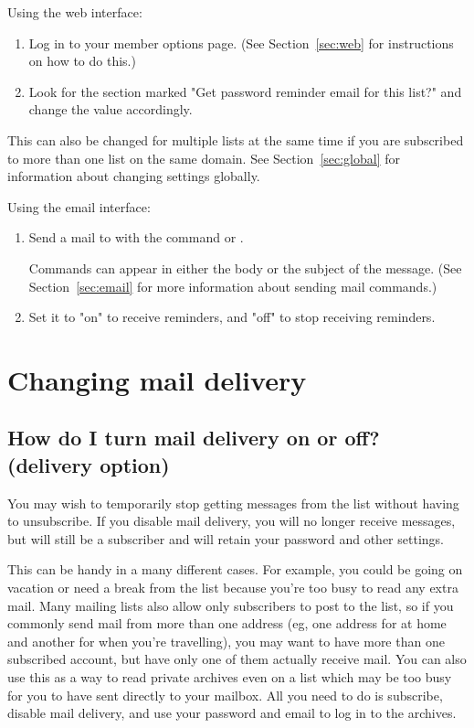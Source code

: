 \documentclass{howto}
\begin{document}
Using the web interface:
\begin{enumerate}
	\item Log in to your member options page.  (See Section~\ref{sec:web} for 
	instructions on how to do this.)
	\item Look for the section marked "Get password reminder email for this
	list?" and change the value accordingly.
\end{enumerate}

This can also be changed for multiple lists at the same time if you are subscribed to 
more than one list on the same domain.  See Section~\ref{sec:global} for 
information about changing settings globally.

Using the email interface:
\begin{enumerate}
   \item Send a mail to  with the command
    or .

   Commands can appear
   in either the body or the subject of the message.  (See
   Section~\ref{sec:email} for more information about sending mail
   commands.)
	\item Set it to "on" to receive reminders, and "off" to stop receiving
	reminders.
\end{enumerate}


\section{Changing mail delivery}
\subsection{How do I turn mail delivery on or off? 
	(delivery option)\label{sec:nomail}}

You may wish to temporarily stop getting messages from the 
list without having to unsubscribe.
If you disable mail delivery, you will no longer receive messages, but will
still be a subscriber and will retain your password and other settings.  

This can be handy in a many different cases.  For example, you could be 
going on vacation or need a break from the list because you're too busy to 
read any extra mail. 
Many mailing lists also allow only subscribers to post to the list, so if you
commonly send mail from more than one address (eg, one address for at home
and another for when you're travelling), you may want to have more than
one subscribed account, but have only one of them actually receive mail.
You can also use this as a way to read private archives even on a list which
may be too busy for you to have sent directly to your mailbox.  All you need to do is subscribe, disable mail delivery, and use your password and email to 
log in to the archives.
\end{document}
